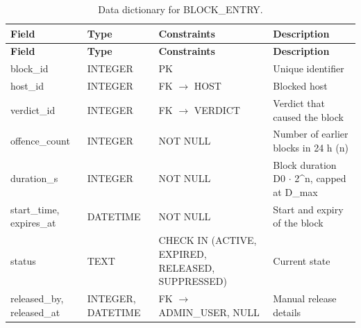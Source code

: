 {\small
\begin{longtable}{|>{\raggedright\arraybackslash}p{}|>{\raggedright\arraybackslash}p{}|>{\raggedright\arraybackslash}p{}|>{\raggedright\arraybackslash}p{}|}
\caption{Data dictionary for BLOCK\_ENTRY.}\label{tab:4.22}\\
\hline
\textbf{Field} & \textbf{Type} & \textbf{Constraints} & \textbf{Description} \\ \hline
\endfirsthead
\hline
\textbf{Field} & \textbf{Type} & \textbf{Constraints} & \textbf{Description} \\ \hline
\endhead
block\_id & INTEGER & PK & Unique identifier \\ \hline
host\_id & INTEGER & FK $\rightarrow$ HOST & Blocked host \\ \hline
verdict\_id & INTEGER & FK $\rightarrow$ VERDICT & Verdict that caused the block \\ \hline
offence\_count & INTEGER & NOT NULL & Number of earlier blocks in 24 h (n) \\ \hline
duration\_s & INTEGER & NOT NULL & Block duration D0 $\cdot$ 2\^{}n, capped at D\_max \\ \hline
start\_time, expires\_at & DATETIME & NOT NULL & Start and expiry of the block \\ \hline
status & TEXT & CHECK IN (ACTIVE, EXPIRED, RELEASED, SUPPRESSED) & Current state \\ \hline
released\_by, released\_at & INTEGER, DATETIME & FK $\rightarrow$ ADMIN\_USER, NULL & Manual release details \\ \hline
\end{longtable}
}

